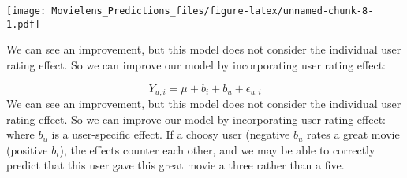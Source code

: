 \documentclass[
]{article}
\newenvironment{Shaded}{\begin{snugshade}}{\end{snugshade}}
\newcommand{\CommentTok}[1]{\textcolor[rgb]{0.00,0.40,1.00}{\textbf{\textit{#1}}}}
\newcommand{\DataTypeTok}[1]{\textcolor[rgb]{0.74,0.68,0.62}{\underline{#1}}}
\newcommand{\DecValTok}[1]{\textcolor[rgb]{0.27,0.67,0.26}{#1}}
\newcommand{\KeywordTok}[1]{\textcolor[rgb]{0.26,0.66,0.93}{\textbf{#1}}}
\newcommand{\NormalTok}[1]{\textcolor[rgb]{0.74,0.68,0.62}{#1}}
\newcommand{\OperatorTok}[1]{\textcolor[rgb]{0.74,0.68,0.62}{#1}}
\newcommand{\StringTok}[1]{\textcolor[rgb]{0.02,0.61,0.04}{#1}}
\begin{document}
\begin{Shaded}
\end{Shaded}

\texttt{[image: Movielens\_Predictions\_files/figure-latex/unnamed-chunk-8-1.pdf]}

We can see an improvement, but this model does not consider the
individual user rating effect. So we can improve our model by
incorporating user rating effect:

\[Y_{u, i} = \mu + b_{i} + b_{u} + \epsilon_{u, i}\] We can see an
improvement, but this model does not consider the individual user rating
effect. So we can improve our model by incorporating user rating effect:
where \(b_{u}\) is a user-specific effect. If a choosy user (negative
\(b_{u}\) rates a great movie (positive \(b_{i}\)), the effects counter
each other, and we may be able to correctly predict that this user gave
this great movie a three rather than a five.
\end{document}

